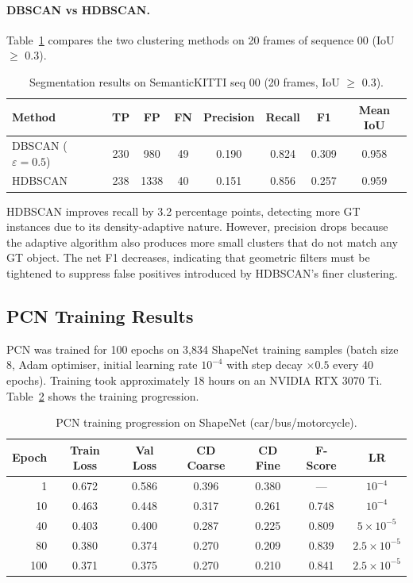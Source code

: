 \documentclass[runningheads]{llncs}
\begin{document}
\paragraph{DBSCAN vs HDBSCAN.} Table~\ref{tab:seg_eval} compares the two clustering methods on 20 frames of sequence 00 (IoU $\geq$ 0.3).

\begin{table}[htbp]
\caption{Segmentation results on SemanticKITTI seq 00 (20 frames, IoU $\geq$ 0.3).}\label{tab:seg_eval}
\centering
\begin{tabular}{lccccccc}
\toprule
Method & TP & FP & FN & Precision & Recall & F1 & Mean IoU \\
\midrule
DBSCAN ($\varepsilon = 0.5$) & 230 & 980 & 49 & 0.190 & 0.824 & 0.309 & 0.958 \\
HDBSCAN & 238 & 1338 & 40 & 0.151 & 0.856 & 0.257 & 0.959 \\
\bottomrule
\end{tabular}
\end{table}

HDBSCAN improves recall by 3.2 percentage points, detecting more GT instances due to its density-adaptive nature. However, precision drops because the adaptive algorithm also produces more small clusters that do not match any GT object. The net F1 decreases, indicating that geometric filters must be tightened to suppress false positives introduced by HDBSCAN's finer clustering.


\subsection{PCN Training Results}

PCN was trained for 100 epochs on 3{,}834 ShapeNet training samples (batch size 8, Adam optimiser, initial learning rate $10^{-4}$ with step decay $\times 0.5$ every 40 epochs). Training took approximately 18 hours on an NVIDIA RTX 3070 Ti. Table~\ref{tab:pcn_train} shows the training progression.

\begin{table}[htbp]
\caption{PCN training progression on ShapeNet (car/bus/motorcycle).}\label{tab:pcn_train}
\centering
\begin{tabular}{rcccccc}
\toprule
Epoch & Train Loss & Val Loss & CD Coarse & CD Fine & F-Score & LR \\
\midrule
1   & 0.672 & 0.586 & 0.396 & 0.380 & ---   & $10^{-4}$ \\
10  & 0.463 & 0.448 & 0.317 & 0.261 & 0.748 & $10^{-4}$ \\
40  & 0.403 & 0.400 & 0.287 & 0.225 & 0.809 & $5 \times 10^{-5}$ \\
80  & 0.380 & 0.374 & 0.270 & 0.209 & 0.839 & $2.5 \times 10^{-5}$ \\
100 & 0.371 & 0.375 & 0.270 & 0.210 & 0.841 & $2.5 \times 10^{-5}$ \\
\bottomrule
\end{tabular}
\end{table}
\end{document}
